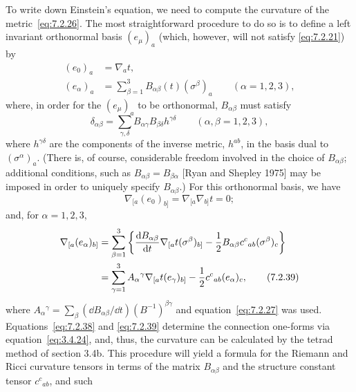 To write down Einstein's equation, we need to compute the curvature of the
metric~\eqref{eq:7.2.26}. The most straightforward procedure to do so is to define
a left invariant orthonormal basis \((e_\mu)_a\) (which, however, will not satisfy
\eqref{eq:7.2.21}) by
\begin{align}
  (e_0)_a&=\nabla_at ,
  \tag{7.2.35}\label{eq:7.2.35}\\
  (e_\alpha)_a&=\sum_{\beta=1}^{3}
    B_{\alpha\beta}(t)(\sigma^\beta)_a
    \qquad(\alpha=1,2,3) ,
  \tag{7.2.36}\label{eq:7.2.36}
\end{align}
where, in order for the \((e_\mu)_a\) to be orthonormal, \(B_{\alpha\beta}\)
must satisfy
\begin{equation}
  \delta_{\alpha\beta}
    =\sum_{\gamma,\delta}
      B_{\alpha\gamma}B_{\beta\delta}h^{\gamma\delta}
    \qquad(\alpha,\beta=1,2,3) ,
  \tag{7.2.37}\label{eq:7.2.37}
\end{equation}
where \(h^{\gamma\delta}\) are the components of the inverse metric, \(h^{ab}\),
in the basis dual to \((\sigma^\alpha)_a\). (There is, of course, considerable
freedom involved in the choice of \(B_{\alpha\beta}\); additional conditions, such
as \(B_{\alpha\beta}=B_{\beta\alpha}\) [Ryan and Shepley 1975] may be imposed in
order to uniquely specify \(B_{\alpha\beta}\).) For this orthonormal basis, we have
\begin{equation}
  \nabla_{[a}(e_0)_{b]}=\nabla_{[a}\nabla_{b]}t=0 ;
  \tag{7.2.38}\label{eq:7.2.38}
\end{equation}
and, for \(\alpha=1,2,3\),
\begin{align}
  \nabla_{[a}(e_\alpha)_{b]}
    &=\sum_{\beta=1}^{3}
      \left\{
        \frac{\mathop{}\!\mathrm{d} B_{\alpha\beta}}{\mathop{}\!\mathrm{d} t}
          \nabla_{[a}t(\sigma^\beta)_{b]}
        -\frac12B_{\alpha\beta}c^c{}_{ab}(\sigma^\beta)_c
      \right\} \notag\\
    &=\sum_{\gamma=1}^{3}
      A_\alpha{}^\gamma\nabla_{[a}t(e_\gamma)_{b]}
      -\frac12c^c{}_{ab}(e_\alpha)_c ,
  \tag{7.2.39}\label{eq:7.2.39}
\end{align}
where
\(A_\alpha{}^\gamma
  =\sum_\beta(\dd B_{\alpha\beta}/\dd t)(B^{-1})^{\beta\gamma}\)
and equation~\eqref{eq:7.2.27} was used.
Equations~\eqref{eq:7.2.38} and \eqref{eq:7.2.39} determine the connection
one-forms via equation~\eqref{eq:3.4.24}, and, thus, the curvature can be
calculated by the tetrad method of section 3.4b. This procedure will yield a formula
for the Riemann and Ricci curvature tensors in terms of the matrix
\(B_{\alpha\beta}\) and the structure constant tensor \(c^c{}_{ab}\), and such

